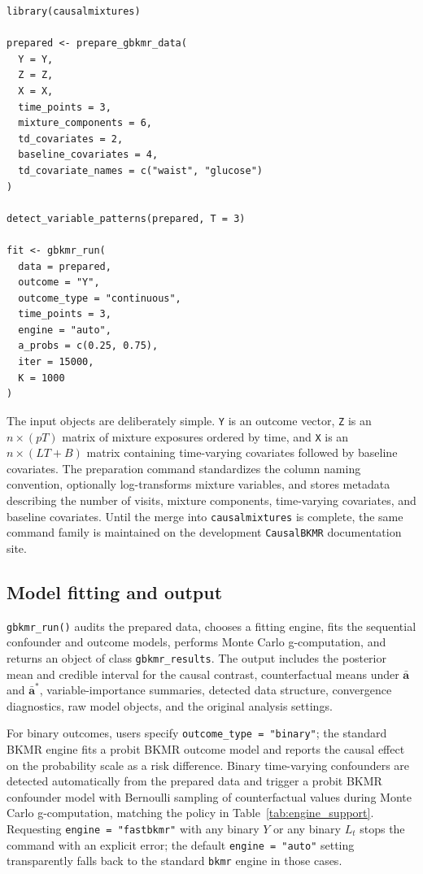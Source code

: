\documentclass[11pt]{article}
\newcommand{\pkg}[1]{\texttt{#1}}
\newcommand{\code}[1]{\texttt{#1}}
\begin{document}
\begin{verbatim}
library(causalmixtures)

prepared <- prepare_gbkmr_data(
  Y = Y,
  Z = Z,
  X = X,
  time_points = 3,
  mixture_components = 6,
  td_covariates = 2,
  baseline_covariates = 4,
  td_covariate_names = c("waist", "glucose")
)

detect_variable_patterns(prepared, T = 3)

fit <- gbkmr_run(
  data = prepared,
  outcome = "Y",
  outcome_type = "continuous",
  time_points = 3,
  engine = "auto",
  a_probs = c(0.25, 0.75),
  iter = 15000,
  K = 1000
)
\end{verbatim}

The input objects are deliberately simple. \code{Y} is an outcome vector, \code{Z} is an $n \times (pT)$ matrix of mixture exposures ordered by time, and \code{X} is an $n \times (L T + B)$ matrix containing time-varying covariates followed by baseline covariates. The preparation command standardizes the column naming convention, optionally log-transforms mixture variables, and stores metadata describing the number of visits, mixture components, time-varying covariates, and baseline covariates. Until the merge into \pkg{causalmixtures} is complete, the same command family is maintained on the development \pkg{CausalBKMR} documentation site.

\subsection*{Model fitting and output}
\code{gbkmr\_run()} audits the prepared data, chooses a fitting engine, fits the sequential confounder and outcome models, performs Monte Carlo g-computation, and returns an object of class \code{gbkmr\_results}. The output includes the posterior mean and credible interval for the causal contrast, counterfactual means under $\bar{\mathbf{a}}$ and $\bar{\mathbf{a}}^*$, variable-importance summaries, detected data structure, convergence diagnostics, raw model objects, and the original analysis settings.

For binary outcomes, users specify \code{outcome\_type = "binary"}; the standard BKMR engine fits a probit BKMR outcome model and reports the causal effect on the probability scale as a risk difference. Binary time-varying confounders are detected automatically from the prepared data and trigger a probit BKMR confounder model with Bernoulli sampling of counterfactual values during Monte Carlo g-computation, matching the policy in Table~\ref{tab:engine_support}. Requesting \code{engine = "fastbkmr"} with any binary $Y$ or any binary $L_t$ stops the command with an explicit error; the default \code{engine = "auto"} setting transparently falls back to the standard \pkg{bkmr} engine in those cases.
\end{document}
